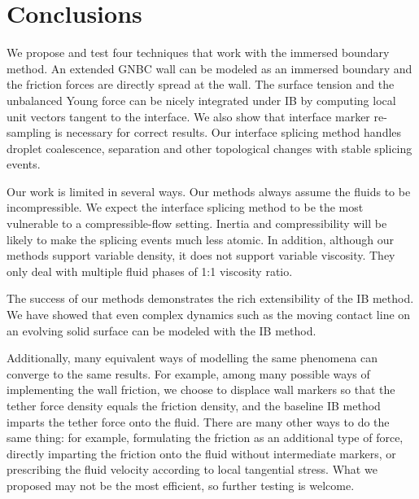 \documentclass{jfm}
\newcommand{\daniel}[1]{\todo[inline,color=yellow!40]{Daniel: #1}}
\begin{document}
    

\section{Conclusions} \label{sec:conclusion}
We propose and test four techniques that work with the immersed boundary method. An extended GNBC wall can be modeled as an immersed boundary and the friction forces are directly spread at the wall. The surface tension and the unbalanced Young force can be nicely integrated under IB by computing local unit vectors tangent to the interface. We also show that interface marker re-sampling is necessary for correct results. Our interface splicing method handles droplet coalescence, separation and other topological changes with stable splicing events. 

Our work is limited in several ways. Our methods always assume the fluids to be incompressible. We expect the interface splicing method to be the most vulnerable to a compressible-flow setting. Inertia and compressibility will be likely to make the splicing events much less atomic. In addition, although our methods support variable density, it does not support variable viscosity. They only deal with multiple fluid phases of 1:1 viscosity ratio. 

The success of our methods demonstrates the rich extensibility of the IB method. We have showed that even complex dynamics such as the moving contact line on an evolving solid surface can be modeled with the IB method. 

Additionally, many equivalent ways of modelling the same phenomena can converge to the same results. For example, among many possible ways of implementing the wall friction, we choose to displace wall markers so that the tether force density equals the friction density, and the baseline IB method imparts the tether force onto the fluid. There are many other ways to do the same thing: for example, formulating the friction as an additional type of force, directly imparting the friction onto the fluid without intermediate markers, or prescribing the fluid velocity according to local tangential stress. What we proposed may not be the most efficient, so further testing is welcome. 
\daniel{I don't know, drop the last paragraph?}
\end{document}
